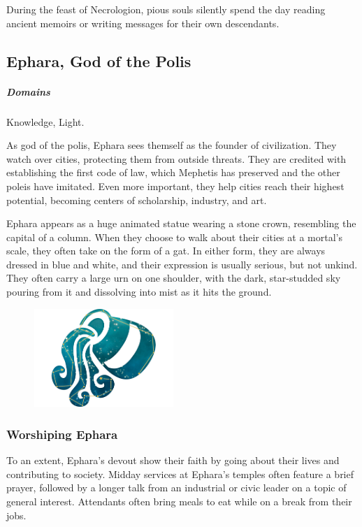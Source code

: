         During the feast of Necrologion, pious souls silently spend the day reading ancient memoirs or writing messages for their own descendants.

\subsection*{Ephara, God of the Polis} \label{ssec::ephara}
    \subparagraph{Domains} Knowledge, Light.

    As god of the polis, Ephara sees themself as the founder of civilization.
    They watch over cities, protecting them from outside threats.
    They are credited with establishing the first code of law, which Mephetis has preserved and the other poleis have imitated.
    Even more important, they help cities reach their highest potential, becoming centers of scholarship, industry, and art.

    Ephara appears as a huge animated statue wearing a stone crown, resembling the capital of a column.
    When they choose to walk about their cities at a mortal's scale, they often take on the form of a gat.
    In either form, they are always dressed in blue and white, and their expression is usually serious, but not unkind.
    They often carry a large urn on one shoulder, with the dark, star-studded sky pouring from it and dissolving into mist as it hits the ground.

    \begin{figure}[b]
        \centering
        \includegraphics[width=0.47\textwidth]{02viphoger/img/10s_ephara.png}
    \end{figure}

    \subsubsection{Worshiping Ephara}
        To an extent, Ephara's devout show their faith by going about their lives and contributing to society.
        Midday services at Ephara's temples often feature a brief prayer, followed by a longer talk from an industrial or civic leader on a topic of general interest.
        Attendants often bring meals to eat while on a break from their jobs.

